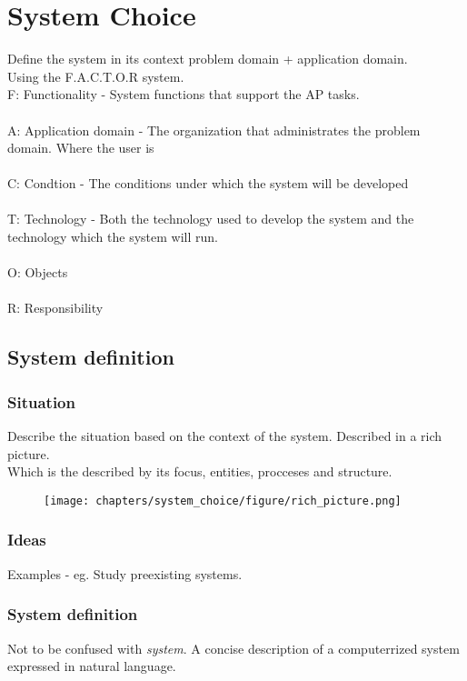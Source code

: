 \chapter{System Choice}
Define the system in its context problem domain + application domain.\\
Using the F.A.C.T.O.R system.\\
F: Functionality - System functions that support the AP tasks.
\\\\
A: Application domain - The organization that administrates the problem domain.
Where the user is
\\\\
C: Condtion - The conditions under which the system will be developed
\\\\
T: Technology - Both the technology used to develop the system and the technology which the system will run.
\\\\
O: Objects
\\\\
R: Responsibility

\section{System definition}
\subsection*{Situation}
Describe the situation based on the context of the system. Described in a rich picture.\\
Which is the described by its focus, entities, procceses and structure.

\begin{figure}[h]
    \centering
    \texttt{[image: chapters/system\_choice/figure/rich\_picture.png]}
\end{figure}
\subsection*{Ideas}
Examples - eg. Study preexisting systems.

\subsection*{System definition}
Not to be confused with \textit{system}. A concise description of a computerrized system expressed in natural language.


